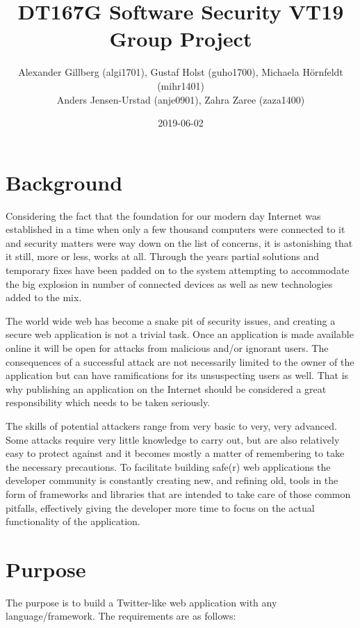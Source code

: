\documentclass[11pt,english]{article}
\title{DT167G Software Security VT19\\Group Project}
\author{Alexander Gillberg (algi1701), Gustaf Holst (guho1700), Michaela Hörnfeldt (mihr1401)\\Anders Jensen-Urstad (anje0901), Zahra Zaree (zaza1400)}
\date{2019-06-02}
\begin{document}
\begin{titlingpage}
\maketitle
\end{titlingpage}

\section{Background}
Considering the fact that the foundation for our modern day Internet was established in a time when only a few thousand computers were connected to it and security matters were way down on the list of concerns, it is astonishing that it still, more or less, works at all. Through the years partial solutions and temporary fixes have been padded on to the system attempting to accommodate the big explosion in number of connected devices as well as new technologies added to the mix.

The world wide web has become a snake pit of security issues, and creating a secure web application is not a trivial task. Once an application is made available online it will be open for attacks from malicious and/or ignorant users. The consequences of a successful attack are not necessarily limited to the owner of the application but can have ramifications for its unsuspecting users as well. That is why publishing an application on the Internet should be considered a great responsibility which needs to be taken seriously.

The skills of potential attackers range from very basic to very, very advanced. Some attacks require very little knowledge to carry out, but are also relatively easy to protect against and it becomes mostly a matter of remembering to take the necessary precautions. To facilitate building safe(r) web applications the developer community is constantly creating new, and refining old, tools in the form of frameworks and libraries that are intended to take care of those common pitfalls, effectively giving the developer more time to focus on the actual functionality of the application.

\section{Purpose}

The purpose is to build a Twitter-like web application with any language/framework. The requirements are as follows:
\end{document}
